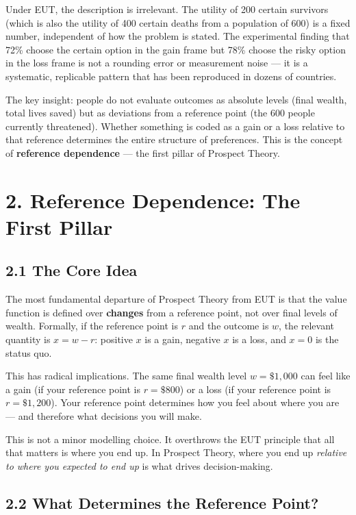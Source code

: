 \documentclass[12pt, letterpaper]{article}
\begin{document}
Under EUT, the description is irrelevant. The utility of 200 certain survivors (which is also the utility of 400 certain deaths from a population of 600) is a fixed number, independent of how the problem is stated. The experimental finding that 72\% choose the certain option in the gain frame but 78\% choose the risky option in the loss frame is not a rounding error or measurement noise --- it is a systematic, replicable pattern that has been reproduced in dozens of countries.

The key insight: people do not evaluate outcomes as absolute levels (final wealth, total lives saved) but as deviations from a reference point (the 600 people currently threatened). Whether something is coded as a gain or a loss relative to that reference determines the entire structure of preferences. This is the concept of \textbf{reference dependence} --- the first pillar of Prospect Theory.

\medskip


\section{2. Reference Dependence: The First Pillar}



\subsection{2.1 The Core Idea}


The most fundamental departure of Prospect Theory from EUT is that the value function is defined over \textbf{changes} from a reference point, not over final levels of wealth. Formally, if the reference point is $r$ and the outcome is $w$, the relevant quantity is $x = w - r$: positive $x$ is a gain, negative $x$ is a loss, and $x = 0$ is the status quo.

This has radical implications. The same final wealth level $w = \$1{,}000$ can feel like a gain (if your reference point is $r = \$800$) or a loss (if your reference point is $r = \$1{,}200$). Your reference point determines how you feel about where you are --- and therefore what decisions you will make.

This is not a minor modelling choice. It overthrows the EUT principle that all that matters is where you end up. In Prospect Theory, where you end up \textit{relative to where you expected to end up} is what drives decision-making.

\subsection{2.2 What Determines the Reference Point?}
\end{document}
